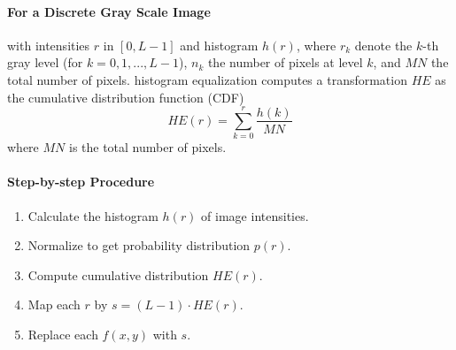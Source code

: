 \paragraph{For a Discrete Gray Scale Image}
with intensities $r$ in $[0, L-1]$ and histogram $h(r)$, where $ r_k $ denote the $ k $-th gray level (for $ k = 0, 1, ..., L-1 $), $ n_k $ the number of pixels at level $ k $, and $ MN $ the total number of pixels. histogram equalization computes a transformation $HE$ as the cumulative distribution function (CDF)
$$
HE(r) = \sum_{k=0}^{r} \frac{h(k)}{MN}
$$
where $MN$ is the total number of pixels.


\paragraph{Step-by-step Procedure}
\begin{enumerate}
    \item Calculate the histogram $h(r)$ of image intensities.
    \item Normalize to get probability distribution $p(r)$.
    \item Compute cumulative distribution $HE(r)$.
    \item Map each $r$ by $s = (L-1) \cdot HE(r)$.
    \item Replace each $f(x, y)$ with $s$.
\end{enumerate}

